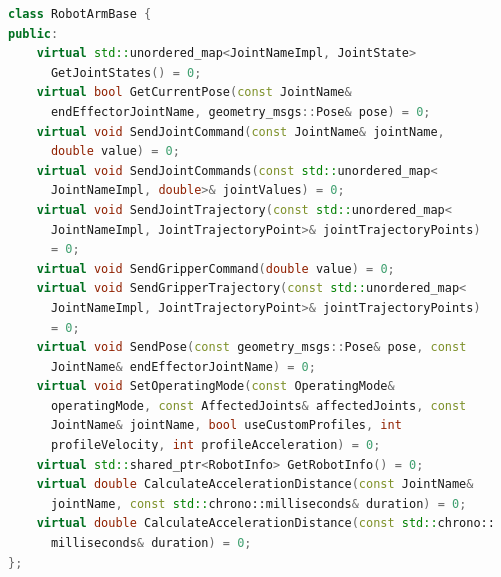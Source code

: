 \begin{lstlisting}[language=C++, caption={\quoteMark{RobotArmBase}-Programmierschnittstelle zur Anbindung eines Industrieroboters}, label={lst:robot_arm_base_interface}]
class RobotArmBase {
public:
    virtual std::unordered_map<JointNameImpl, JointState>
      GetJointStates() = 0;
    virtual bool GetCurrentPose(const JointName&
      endEffectorJointName, geometry_msgs::Pose& pose) = 0;
    virtual void SendJointCommand(const JointName& jointName,
      double value) = 0;
    virtual void SendJointCommands(const std::unordered_map<
      JointNameImpl, double>& jointValues) = 0;
    virtual void SendJointTrajectory(const std::unordered_map<
      JointNameImpl, JointTrajectoryPoint>& jointTrajectoryPoints)
      = 0;
    virtual void SendGripperCommand(double value) = 0;
    virtual void SendGripperTrajectory(const std::unordered_map<
      JointNameImpl, JointTrajectoryPoint>& jointTrajectoryPoints)
      = 0;
    virtual void SendPose(const geometry_msgs::Pose& pose, const
      JointName& endEffectorJointName) = 0;
    virtual void SetOperatingMode(const OperatingMode&
      operatingMode, const AffectedJoints& affectedJoints, const
      JointName& jointName, bool useCustomProfiles, int
      profileVelocity, int profileAcceleration) = 0;
    virtual std::shared_ptr<RobotInfo> GetRobotInfo() = 0;
    virtual double CalculateAccelerationDistance(const JointName&
      jointName, const std::chrono::milliseconds& duration) = 0;
    virtual double CalculateAccelerationDistance(const std::chrono::
      milliseconds& duration) = 0;
};
\end{lstlisting}\leavevmode\newline\vspace{-1.0em}

